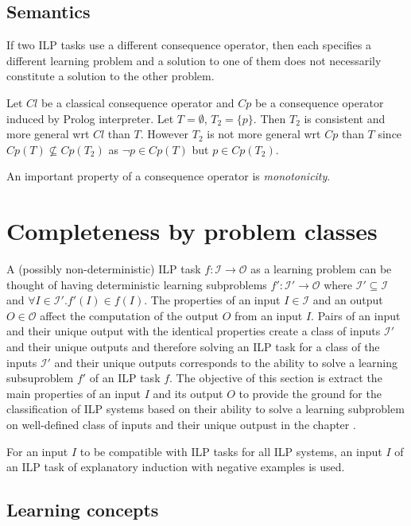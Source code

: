 \subsection{Semantics}
If two ILP tasks use a different consequence operator, then each specifies a different learning problem and a solution to one of them does not necessarily constitute a solution to the other problem.

\begin{exmp}
Let $Cl$ be a classical consequence operator and $Cp$ be a consequence operator induced by Prolog interpreter. Let $T=\emptyset$, $T_2=\{p\}$.
Then $T_2$ is consistent and more general wrt $Cl$ than $T$. However $T_2$ is not more general wrt $Cp$ than $T$ since $Cp(T) \not\subseteq Cp(T_2)$ as $\neg p \in Cp(T)$ but $p \in Cp(T_2)$.
\end{exmp}

An important property of a consequence operator is \emph{monotonicity}.

\section{Completeness by problem classes}
A (possibly non-deterministic) ILP task $f:\mathcal{I} \to \mathcal{O}$ as a learning problem can be thought of having deterministic learning subproblems $f':\mathcal{I}' \to \mathcal{O}$ where $\mathcal{I}' \subseteq \mathcal{I}$ and $\forall I \in \mathcal{I}'. f'(I) \in f(I)$. The properties of an input $I \in \mathcal{I}$ and an output $O \in \mathcal{O}$ affect the computation of the output $O$ from an input $I$. Pairs of an input and their unique output with the identical properties create a class of inputs $\mathcal{I}'$ and their unique outputs and therefore solving an ILP task for a class of the inputs $\mathcal{I}'$ and their unique outputs corresponds to the ability to solve a learning subsuproblem $f'$ of an ILP task $f$. The objective of this section is extract the main properties of an input $I$ and its output $O$ to provide the ground for the classification of ILP systems based on their ability to solve a learning subproblem on well-defined class of inputs and their unique outpust in the chapter .

For an input $I$ to be compatible with ILP tasks for all ILP systems, an input $I$ of an ILP task of explanatory induction with negative examples  is used.


\subsection{Learning concepts}


